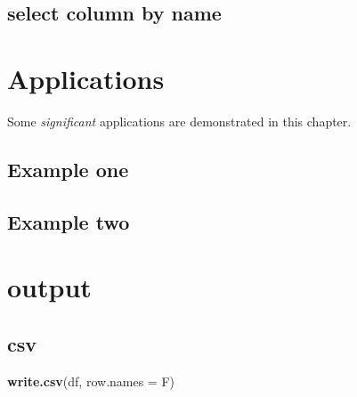 \documentclass[
]{book}
\newenvironment{Shaded}{\begin{snugshade}}{\end{snugshade}}
\newcommand{\DataTypeTok}[1]{\textcolor[rgb]{0.13,0.29,0.53}{#1}}
\newcommand{\KeywordTok}[1]{\textcolor[rgb]{0.13,0.29,0.53}{\textbf{#1}}}
\newcommand{\NormalTok}[1]{#1}
\newcommand{\OperatorTok}[1]{\textcolor[rgb]{0.81,0.36,0.00}{\textbf{#1}}}
\newcommand{\StringTok}[1]{\textcolor[rgb]{0.31,0.60,0.02}{#1}}
\begin{document}
\hypertarget{select-column-by-name}{%
\section{select column by name}\label{select-column-by-name}}

\begin{Shaded}
\end{Shaded}

\hypertarget{applications}{%
\chapter{Applications}\label{applications}}

Some \emph{significant} applications are demonstrated in this chapter.

\hypertarget{example-one}{%
\section{Example one}\label{example-one}}

\hypertarget{example-two}{%
\section{Example two}\label{example-two}}

\hypertarget{output}{%
\chapter{output}\label{output}}

\hypertarget{csv}{%
\section{csv}\label{csv}}

\begin{Shaded}
\begin{Highlighting}[]
\KeywordTok{write.csv}\NormalTok{(df, }\DataTypeTok{row.names =}\NormalTok{ F)}
\end{Highlighting}
\end{Shaded}

  
\end{document}
